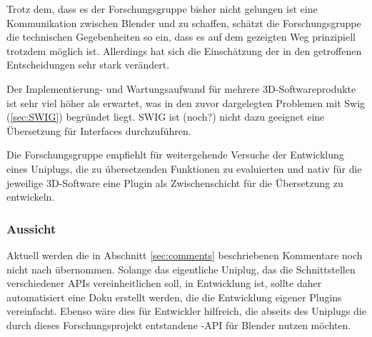 
Trotz dem, dass es der Forschungsgruppe bisher nicht gelungen ist eine Kommunikation zwischen Blender und \CS zu schaffen, schätzt die Forschungsgruppe die technischen Gegebenheiten so ein, dass es auf dem gezeigten Weg prinzipiell trotzdem möglich ist. Allerdings hat sich die Einschätzung der in den  getroffenen Entscheidungen sehr stark verändert.

Der Implementierung- und Wartungsaufwand für mehrere 3D-Softwareprodukte ist sehr viel höher als erwartet, was in den zuvor dargelegten Problemen mit Swig (\ref{sec:SWIG}) begründet liegt. SWIG ist (noch?) nicht dazu geeignet eine Übersetzung für  Interfaces durchzuführen.

Die Forschungsgruppe empfiehlt für weitergehende Versuche der Entwicklung eines Uniplugs, die zu übersetzenden Funktionen zu evaluierten und nativ für die jeweilige 3D-Software eine Plugin als Zwischenschicht für die Übersetzung zu entwickeln.



\subsubsection{Aussicht}

Aktuell werden die in Abschnitt \ref{sec:comments} beschriebenen Kommentare noch nicht nach \CS übernommen. Solange das eigentliche Uniplug, das die Schnittstellen verschiedener APIs vereinheitlichen soll, in Entwicklung ist, sollte daher automatisiert eine Doku erstellt werden, die die Entwicklung eigener Plugins vereinfacht. Ebenso wäre dies für Entwickler hilfreich, die abseits des Uniplugs die durch dieses Forschungsprojekt entstandene \CC-API für Blender nutzen möchten.

